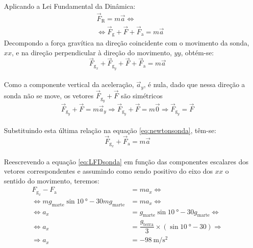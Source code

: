 \documentclass[addpoints,answers]{exam}
\begin{document}
\begin{questions}
\begin{parts}
\begin{solution}
{					Aplicando a Lei Fundamental da Dinâmica:\\
					\begin{align*}
						&\vec{F}_\text{R} = m \vec{a} \Leftrightarrow \\
						&\Leftrightarrow \vec{F}_\text{g} + \vec{F} + \vec{F}_\text{a} = m \vec{a}
					\end{align*}
					Decompondo a força gravítica na direção coincidente com o movimento da sonda, $xx$, e na direção perpendicular à direção do movimento, $yy$, obtém-se:\\
					\begin{equation}
						\vec{F}_\text{g}_x + \vec{F}_\text{g}_y + \vec{F} + \vec{F}_\text{a} = m \vec{a}
						\label{eq:newtonsonda}
					\end{equation}
					\\
					Como a componente vertical da aceleração, $\vec{a}_y$, é nula, dado que nessa direção a sonda não se move, os vetores $\vec{F}_\text{g}_y + \vec{F}$ são simétricos\\
					$$\vec{F}_\text{g}_y + \vec{F} = m \vec{a}_y \Rightarrow \vec{F}_\text{g}_y + \vec{F} = m \vec{0} \Rightarrow \vec{F}_\text{g}_y = \vec{F}$$\\
					Substituindo esta última relação na equação \ref{eq:newtonsonda}, têm-se:\\
					\begin{equation}
						\vec{F}_\text{g}_x + \vec{F}_\text{a} = m \vec{a}
						\label{eq:LFDsonda}
					\end{equation}
					\\
					Reescrevendo a equação \ref{eq:LFDsonda} em função das componentes escalares dos vetores correspondentes e assumindo como sendo positivo do eixo dos $xx$ o sentido do movimento, teremos:\\
					\begin{align*}
						F_\text{g}_x - F_\text{a} &= m a_x \Leftrightarrow \\
						\Leftrightarrow m g_\text{marte} \sin \SI{10}{\degree} - 30 m g_\text{marte} &= m a_x \Leftrightarrow \\
						\Leftrightarrow a_x &= g_\text{marte} \sin \SI{10}{\degree} - 30 g_\text{marte} \Leftrightarrow \\
						\Leftrightarrow a_x &= \dfrac{g_\text{terra}}{3} \times (\sin \SI{10}{\degree} - 30) \Rightarrow \\
						\Rightarrow a_x &= \SI{-98}{\meter\per\second\squared}
					\end{align*}
					
}
\end{solution}
\end{parts}
\end{questions}
\end{document}
